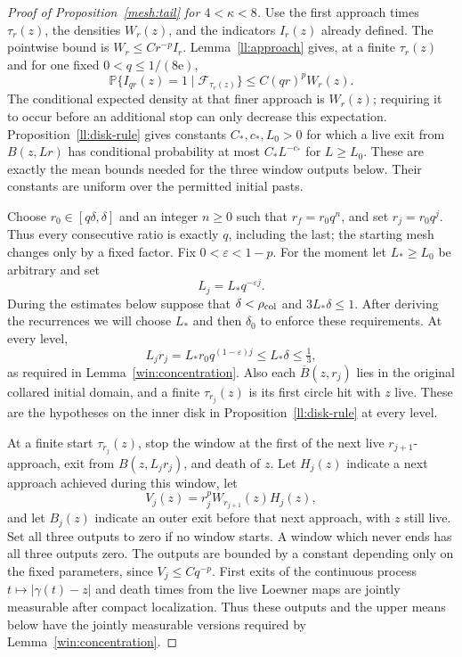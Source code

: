 \documentclass[11pt]{article}
\theoremstyle{definition}
\theoremstyle{remark}
\numberwithin{equation}{section}
\begin{document}
\begin{proof}[Proof of Proposition~\ref{mesh:tail} for $4<\kappa<8$]
Use the first approach times $\tau_r(z)$, the densities $W_r(z)$,
and the indicators $I_r(z)$ already defined. The pointwise bound is
$W_r\le Cr^{-p}I_r$. Lemma~\ref{ll:approach} gives, at a finite
$\tau_r(z)$ and for one fixed $0<q\le1/(8\mathrm e)$,
\begin{equation}
 \mathbb P\{I_{qr}(z)=1\mid\mathcal F_{\tau_r(z)}\}
       \le C(qr)^pW_r(z).
 \label{win:onepoint-input}
\end{equation}
The conditional expected density at that finer approach is $W_r(z)$;
requiring it to occur before an additional stop can only decrease this
expectation. Proposition~\ref{ll:disk-rule} gives constants
$C_*,c_*,L_0>0$ for which a live exit from $B(z,Lr)$ has conditional
probability at most $C_*L^{-c_*}$ for $L\ge L_0$.
These are exactly the mean bounds needed for the three window outputs
below. Their constants are uniform over the permitted initial pasts.

Choose $r_0\in[q\delta,\delta]$ and an integer $n\ge0$ such that
$r_f=r_0q^n$, and set $r_j=r_0q^j$.  Thus every consecutive ratio is
exactly $q$, including the last; the starting mesh changes only by a
fixed factor.  Fix $0<\varepsilon<1-p$.  For the moment let
$L_*\ge L_0$ be arbitrary and set
\[
 L_j=L_*q^{-\varepsilon j}.
\]
During the estimates below suppose that $\delta<\rho_{\rm col}$ and
$3L_*\delta\le1$.  After deriving the recurrences we
will choose $L_*$ and then $\delta_0$ to enforce these requirements.
At every level,
\[
 L_jr_j=L_*r_0q^{(1-\varepsilon)j}\le L_*\delta\le\tfrac13,
\]
as required in Lemma~\ref{win:concentration}.  Also each
$\overline B(z,r_j)$ lies in the original collared initial domain, and a finite
$\tau_{r_j}(z)$ is its first circle hit with $z$ live.  These are the
hypotheses on the inner disk in Proposition~\ref{ll:disk-rule} at every level.

At a finite start $\tau_{r_j}(z)$, stop the window at the first of
the next live $r_{j+1}$-approach, exit from $B(z,L_jr_j)$, and death
of $z$.  Let $H_j(z)$ indicate a next approach achieved during this
window, let
\[
 V_j(z)=r_j^pW_{r_{j+1}}(z)H_j(z),
\]
and let $B_j(z)$ indicate an outer exit before that next approach,
with $z$ still live.  Set all three outputs to zero if no window
starts.  A window which never ends has all three outputs zero.
The outputs are bounded by a constant depending only on the fixed
parameters, since $V_j\le Cq^{-p}$.
First exits of the continuous process $t\mapsto|\gamma(t)-z|$ and death times
from the live Loewner maps are jointly measurable after compact
localization.  Thus these outputs and the upper means below have the
jointly measurable versions required by Lemma~\ref{win:concentration}.


\end{proof}
\end{document}
